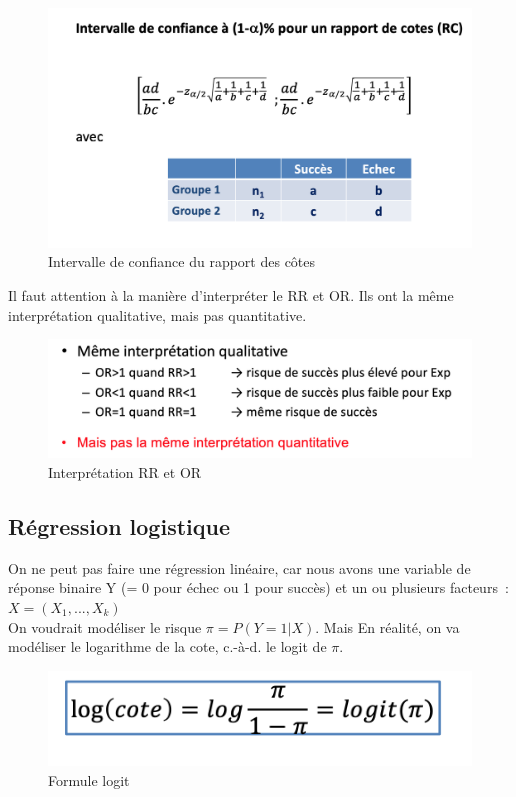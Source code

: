\begin{figure}[H]
    \centering
    \includegraphics[scale=0.5]{images/intervaldeconfiance.png}
    \caption{Intervalle de confiance du rapport des côtes}
    \label{fig:my_label}
\end{figure}
Il faut attention à la manière d'interpréter le RR et OR. Ils ont la même interprétation qualitative, mais pas quantitative.
\begin{figure}[H]
    \centering
    \includegraphics[scale =0.3]{images/RROR.png}
    \caption{Interprétation RR et OR}
    \label{fig:RROR}
\end{figure}
\subsection{Régression logistique}
On ne peut pas faire une régression linéaire, car nous avons une variable de réponse binaire Y (= 0 pour échec ou 1 pour succès) et un ou plusieurs facteurs : $X=(X_{1}, ..., X_{k})$\\

On voudrait modéliser le risque $\pi = P(Y=1|X)$. Mais En réalité, on va modéliser le logarithme de la cote, c.-à-d. le logit de $\pi$.

\begin{figure}[H]
    \centering
    \includegraphics[scale = 0.3]{images/logit.png}
    \caption{Formule logit}
    \label{fig:my_label}
\end{figure}

